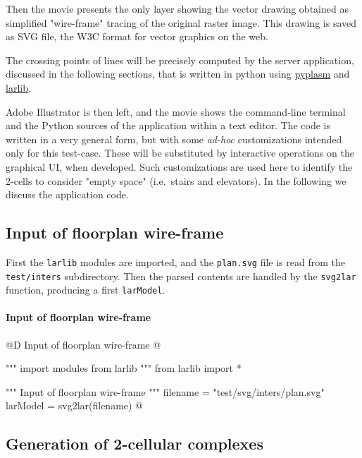\documentclass[11pt,oneside]{article}    %
\begin{document}
Then the movie presents the only layer showing the vector drawing obtained as simplified "wire-frame"  tracing of the original raster image. This drawing is saved as SVG file, the W3C format for vector graphics on the web.

The crossing points of lines will be precisely computed by the server application, discussed in the following sections, that is written in python using \href{https://github.com/plasm-language/pyplasm}{pyplasm} and \href{https://github.com/cvdlab/lar-cc}{larlib}.


Adobe Illustrator is then left, and the movie shows the command-line terminal and the Python sources of the application within a text editor. The code is written in a very general form, but with some \emph{ad-hoc} customizations intended only for this test-case. These will be substituted by interactive operations on the graphical UI, when developed. Such customizations are used here to identify the 2-cells to consider "empty space" (i.e.~stairs and elevators). In the following we discuss the application code.

\subsection{Input of floorplan wire-frame}

First the \texttt{larlib} modules are imported, and the \texttt{plan.svg} file is read from the \texttt{test/inters} subdirectory.
Then the parsed contents are handled by the \texttt{svg2lar} function, producing a first \texttt{larModel}.

\paragraph{Input of floorplan wire-frame}
@D Input of floorplan wire-frame
@{""" import modules from larlib """
from larlib import *

""" Input of floorplan wire-frame """
filename = "test/svg/inters/plan.svg"
larModel = svg2lar(filename)
@}

\subsection{Generation of 2-cellular complexes}
\end{document}
